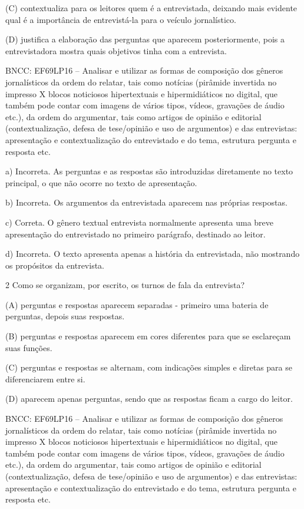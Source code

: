 \begin{itemize}
\begin{itemize}
\begin{escolha}
\begin{escolha}
\begin{escolha}
\begin{escolha}
\begin{escolha}
(C) contextualiza para os leitores quem é a entrevistada, deixando mais
evidente qual é a importância de entrevistá-la para o veículo
jornalístico.

(D) justifica a elaboração das perguntas que aparecem posteriormente,
pois a entrevistadora mostra quais objetivos tinha com a entrevista.

BNCC: EF69LP16 -- Analisar e utilizar as formas de composição dos
gêneros jornalísticos da ordem do relatar, tais como notícias (pirâmide
invertida no impresso X blocos noticiosos hipertextuais e
hipermidiáticos no digital, que também pode contar com imagens de vários
tipos, vídeos, gravações de áudio etc.), da ordem do argumentar, tais
como artigos de opinião e editorial (contextualização, defesa de
tese/opinião e uso de argumentos) e das entrevistas: apresentação e
contextualização do entrevistado e do tema, estrutura pergunta e
resposta etc.

a) Incorreta. As perguntas e as respostas são introduzidas diretamente
no texto principal, o que não ocorre no texto de apresentação.

b) Incorreta. Os argumentos da entrevistada aparecem nas próprias
respostas.

c) Correta. O gênero textual entrevista normalmente apresenta uma breve
apresentação do entrevistado no primeiro parágrafo, destinado ao leitor.

d) Incorreta. O texto apresenta apenas a história da entrevistada, não
mostrando os propósitos da entrevista.

\num{2} Como se organizam, por escrito, os turnos de fala da entrevista?

(A) perguntas e respostas aparecem separadas - primeiro uma bateria de
perguntas, depois suas respostas.

(B) perguntas e respostas aparecem em cores diferentes para que se
esclareçam suas funções.

(C) perguntas e respostas se alternam, com indicações simples e diretas
para se diferenciarem entre si.

(D) aparecem apenas perguntas, sendo que as respostas ficam a cargo do
leitor.

BNCC: EF69LP16 -- Analisar e utilizar as formas de composição dos
gêneros jornalísticos da ordem do relatar, tais como notícias (pirâmide
invertida no impresso X blocos noticiosos hipertextuais e
hipermidiáticos no digital, que também pode contar com imagens de vários
tipos, vídeos, gravações de áudio etc.), da ordem do argumentar, tais
como artigos de opinião e editorial (contextualização, defesa de
tese/opinião e uso de argumentos) e das entrevistas: apresentação e
contextualização do entrevistado e do tema, estrutura pergunta e
resposta etc.


\end{escolha}
\end{escolha}
\end{escolha}
\end{escolha}
\end{escolha}
\end{itemize}
\end{itemize}

